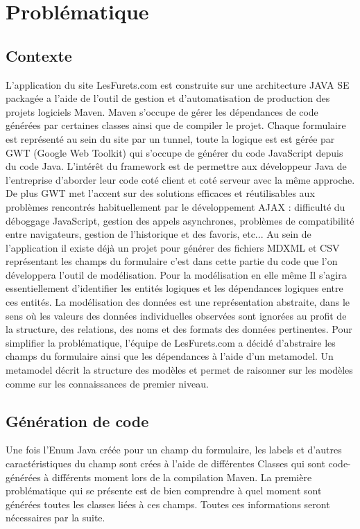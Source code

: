 \chapter{Problématique}

\section{Contexte}
L'application du site LesFurets.com est construite sur une architecture JAVA SE packagée a l’aide de l'outil de gestion et d'automatisation de production des projets logiciels Maven. Maven s’occupe de gérer les dépendances de code générées par certaines classes ainsi que de compiler le projet. Chaque formulaire est représenté au sein du site par un tunnel, toute la logique est est gérée par GWT (Google Web Toolkit) qui s’occupe de générer du code JavaScript depuis du code Java. L'intérêt du framework est de permettre aux développeur Java de l’entreprise d’aborder leur code coté client et coté serveur avec la même approche. De plus GWT met l'accent sur des solutions efficaces et réutilisables aux problèmes rencontrés habituellement par le développement AJAX : difficulté du déboggage JavaScript, gestion des appels asynchrones, problèmes de compatibilité entre navigateurs, gestion de l'historique et des favoris, etc...
Au sein de l’application il existe déjà un projet pour générer des fichiers MDXML et CSV représentant les champs du formulaire c’est dans cette partie du code que l’on développera l’outil de modélisation.
Pour la modélisation en elle même Il s'agira essentiellement d'identifier les entités logiques et les dépendances logiques entre ces entités. La modélisation des données est une représentation abstraite, dans le sens où les valeurs des données individuelles observées sont ignorées au profit de la structure, des relations, des noms et des formats des données pertinentes.
Pour simplifier la problématique, l’équipe de LesFurets.com a décidé d’abstraire les champs du formulaire ainsi que les dépendances à l’aide d'un metamodel. Un metamodel décrit la structure des modèles et permet de raisonner sur les modèles comme sur les connaissances de premier niveau.

\section{Génération de code}
Une fois l'Enum Java créée pour un champ du formulaire, les labels et d'autres caractéristiques du champ sont crées à l'aide de différentes Classes qui sont code-générées à différents moment lors de la compilation Maven. La première problématique qui se présente est de bien comprendre à quel moment sont générées toutes les classes liées à ces champs. Toutes ces informations seront nécessaires par la suite.

